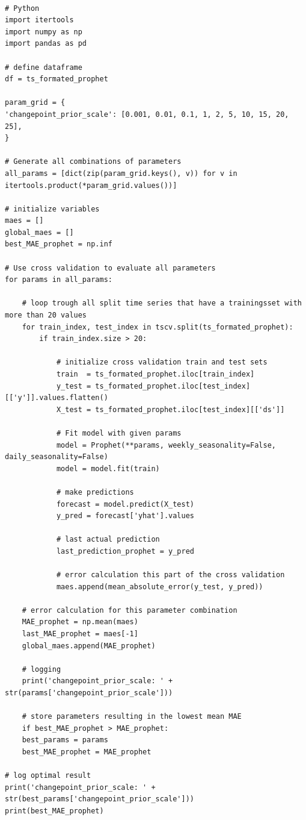 \begin{verbatim}

# Python
import itertools
import numpy as np
import pandas as pd

# define dataframe
df = ts_formated_prophet

param_grid = {  
'changepoint_prior_scale': [0.001, 0.01, 0.1, 1, 2, 5, 10, 15, 20, 25],
}

# Generate all combinations of parameters
all_params = [dict(zip(param_grid.keys(), v)) for v in itertools.product(*param_grid.values())]

# initialize variables
maes = []  
global_maes = []
best_MAE_prophet = np.inf

# Use cross validation to evaluate all parameters
for params in all_params:

    # loop trough all split time series that have a trainingsset with more than 20 values
    for train_index, test_index in tscv.split(ts_formated_prophet):    
        if train_index.size > 20:  
        
            # initialize cross validation train and test sets
            train  = ts_formated_prophet.iloc[train_index]
            y_test = ts_formated_prophet.iloc[test_index][['y']].values.flatten()
            X_test = ts_formated_prophet.iloc[test_index][['ds']]
            
            # Fit model with given params
            model = Prophet(**params, weekly_seasonality=False, daily_seasonality=False)
            model = model.fit(train)
            
            # make predictions
            forecast = model.predict(X_test)
            y_pred = forecast['yhat'].values
            
            # last actual prediction 
            last_prediction_prophet = y_pred
            
            # error calculation this part of the cross validation
            maes.append(mean_absolute_error(y_test, y_pred))
    
    # error calculation for this parameter combination
    MAE_prophet = np.mean(maes)
    last_MAE_prophet = maes[-1]
    global_maes.append(MAE_prophet)
    
    # logging
    print('changepoint_prior_scale: ' + str(params['changepoint_prior_scale']))
    
    # store parameters resulting in the lowest mean MAE
    if best_MAE_prophet > MAE_prophet:
    best_params = params
    best_MAE_prophet = MAE_prophet

# log optimal result          
print('changepoint_prior_scale: ' + str(best_params['changepoint_prior_scale']))
print(best_MAE_prophet)

\end{verbatim}

